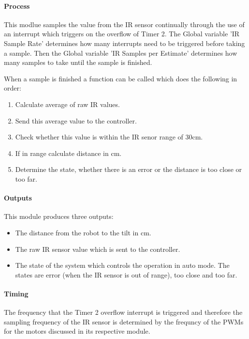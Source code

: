 \documentclass{article}
\begin{document}
\paragraph{Process}

This modlue samples the value from the IR sensor continually through the use of an interrupt which triggers on the overflow of Timer 2. The Global variable 'IR Sample Rate' determines how many interrupts need to be triggered before taking a sample. Then the  Global variable 'IR Samples per Estimate' determines how many samples to take until the sample is finished.

When a sample is finished a function can be called which does the following in order:
\begin{enumerate}
	\item Calculate average of raw IR values. 
	\item Send this average value to the controller. 
	\item Check whether this value is within the IR senor range of 30cm.	
	\item If in range calculate distance in cm.
	\item Determine the state, whether there is an error or the distance is too close or too far.
\end{enumerate}
 
\paragraph{Outputs}
This module produces three outputs:
\begin{itemize}
		\item The distance from the robot to the tilt in cm.
		\item The raw IR sensor value which is sent to the controller.
		\item The state of the system which controls the operation in auto mode. The states are error (when the IR sensor is out of range), too close and too far.
\end{itemize}
  
\paragraph{Timing}
The frequency that the Timer 2 overflow interrupt is triggered and therefore the sampling frequency of the IR sensor is determined by the frequncy of the PWMs for the motors discussed in its respective module. 
\end{document}
